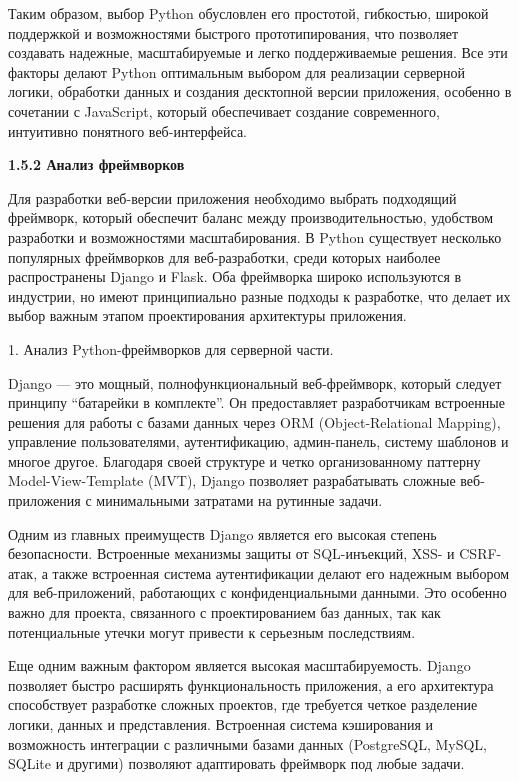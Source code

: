 Таким образом, выбор Python обусловлен его простотой, гибкостью, широкой поддержкой и возможностями быстрого прототипирования, что позволяет создавать надежные, масштабируемые и легко поддерживаемые решения. Все эти факторы делают Python оптимальным выбором для реализации серверной логики, обработки данных и создания десктопной версии приложения, особенно в сочетании с JavaScript, который обеспечивает создание современного, интуитивно понятного веб-интерфейса.

\textbf{\large 1.5.2 Анализ фреймворков}

Для разработки веб-версии приложения необходимо выбрать подходящий фреймворк, который обеспечит баланс между производительностью, удобством разработки и возможностями масштабирования. В Python существует несколько популярных фреймворков для веб-разработки, среди которых наиболее распространены Django и Flask. Оба фреймворка широко используются в индустрии, но имеют принципиально разные подходы к разработке, что делает их выбор важным этапом проектирования архитектуры приложения.

1. Анализ Python-фреймворков для серверной части.

Django — это мощный, полнофункциональный веб-фреймворк, который следует принципу “батарейки в комплекте”. Он предоставляет разработчикам встроенные решения для работы с базами данных через ORM (Object-Relational Mapping), управление пользователями, аутентификацию, админ-панель, систему шаблонов и многое другое. Благодаря своей структуре и четко организованному паттерну Model-View-Template (MVT), Django позволяет разрабатывать сложные веб-приложения с минимальными затратами на рутинные задачи.

Одним из главных преимуществ Django является его высокая степень безопасности. Встроенные механизмы защиты от SQL-инъекций, XSS- и CSRF-атак, а также встроенная система аутентификации делают его надежным выбором для веб-приложений, работающих с конфиденциальными данными. Это особенно важно для проекта, связанного с проектированием баз данных, так как потенциальные утечки могут привести к серьезным последствиям.

Еще одним важным фактором является высокая масштабируемость. Django позволяет быстро расширять функциональность приложения, а его архитектура способствует разработке сложных проектов, где требуется четкое разделение логики, данных и представления. Встроенная система кэширования и возможность интеграции с различными базами данных (PostgreSQL, MySQL, SQLite и другими) позволяют адаптировать фреймворк под любые задачи.

